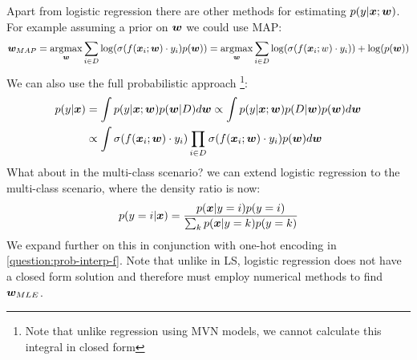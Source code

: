 Apart from logistic regression there are other methods for estimating $p(y|\bm{x};\bm{w})$. For example assuming a prior on $\bm{w}$ we could use MAP:
\begin{equation}
    \bm{w}_{MAP} = \operatorname*{arg\!\max}_{\bm{w}} \sum_{i\in D} \log(\sigma(f(\bm{x}_{i};\bm{w}) \cdot y_{i})p(\bm{w})) = \operatorname*{arg\!\max}_{\bm{w}} \sum_{i \in D} \log(\sigma(f(\bm{x}_{i} ; w) \cdot y_{i})) + \log(p(\bm{w}))
\end{equation}
We can also use the full probabilistic approach \footnote{Note that unlike regression using MVN models, we cannot calculate this integral in closed form}:
\begin{align}
    p(y|\bm{x}) &{} = \int p(y|\bm{x};\bm{w}) p(\bm{w}|D) d\bm{w} \propto \int p(y|\bm{x};\bm{w}) p(D|\bm{w}) p(\bm{w}) d\bm{w} \\ &\propto \int \sigma(f(\bm{x}_{i};\bm{w}) \cdot y_{i}) \prod_{i \in D} \sigma(f(\bm{x}_{i};\bm{w}) \cdot y_{i}) p(\bm{w}) d\bm{w} 
\end{align}
What about in the multi-class scenario? we can extend logistic regression to the multi-class scenario, where the density ratio is now:
\begin{equation}
    p(y=i|\bm{x}) = \frac{p(\bm{x}| y=i)p(y=i)}{\sum_{k} p(\bm{x}|y=k)p(y=k)}
\end{equation}
We expand further on this in conjunction with one-hot encoding in \cref{question:prob-interp-f}. Note that unlike in LS, logistic regression does not have a closed form solution and therefore must employ numerical methods to find $\bm{w}_{MLE}$.